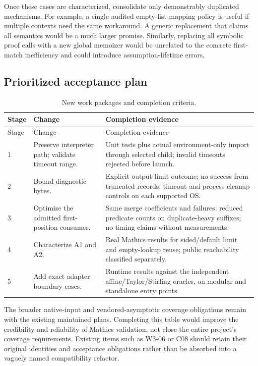 \documentclass[11pt,letterpaper]{article}
\newcommand{\code}[1]{\texttt{\detokenize{#1}}}
\begin{document}
Once these cases are characterized, consolidate only demonstrably duplicated mechanisms. For example, a single audited empty-list mapping policy is useful if multiple contexts need the same workaround. A generic replacement that claims all \code{Map} semantics would be a much larger promise. Similarly, replacing all symbolic proof calls with a new global memoizer would be unrelated to the concrete first-match inefficiency and could introduce assumption-lifetime errors.

\subsection{Prioritized acceptance plan}

\begin{longtable}{@{}P{0.7in}P{2.15in}P{3.47in}@{}}
\caption{New work packages and completion criteria.}\label{tab:plan}\\
\toprule
Stage & Change & Completion evidence \\
\midrule\endfirsthead
\toprule Stage & Change & Completion evidence \\
\midrule{} & Preserve interpreter path; validate timeout range. & Unit tests plus actual environment-only import through selected child; invalid timeouts rejected before launch. \\
2 & Bound diagnostic bytes. & Explicit output-limit outcome; no success from truncated records; timeout and process cleanup controls on each supported OS. \\
3 & Optimize the admitted first-position consumer. & Same merge coefficients and failures; reduced predicate counts on duplicate-heavy suffixes; no timing claims without measurements. \\
4 & Characterize A1 and A2. & Real Mathics results for sided/default limit and empty-lookup reuse; public reachability classified separately. \\
5 & Add exact adapter boundary cases. & Runtime results against the independent affine/Taylor/Stirling oracles, on modular and standalone entry points. \\
\bottomrule
\end{longtable}

The broader native-input and vendored-asymptotic coverage obligations remain with the existing maintained plans. Completing this table would improve the credibility and reliability of Mathics validation, not close the entire project's coverage requirements. Existing items such as W3-06 or C08 should retain their original identities and acceptance obligations rather than be absorbed into a vaguely named compatibility refactor.~\cite{status,wave3}
\end{document}
